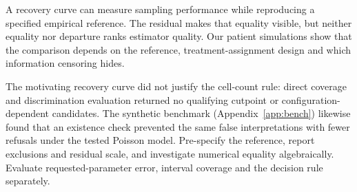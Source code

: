 A recovery curve can measure sampling performance while reproducing a specified
empirical reference. The residual makes that equality visible, but neither
equality nor departure ranks estimator quality. Our patient simulations show
that the comparison depends on the reference, treatment-assignment design and
which information censoring hides.

The motivating recovery curve did not justify the cell-count rule: direct
coverage and discrimination evaluation returned no qualifying cutpoint or
configuration-dependent candidates. The synthetic benchmark
(Appendix~\ref{app:bench}) likewise found that an existence check prevented the
same false interpretations with fewer refusals under the tested Poisson model.
Pre-specify the reference, report exclusions and residual scale, and investigate
numerical equality algebraically. Evaluate requested-parameter error, interval
coverage and the decision rule separately.
